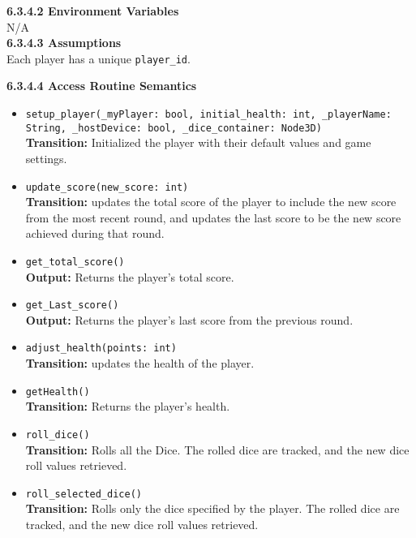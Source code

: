 \documentclass[12pt, titlepage]{article}
\begin{document}
\textbf{6.3.4.2 Environment Variables}\\
N/A\\

\textbf{6.3.4.3 Assumptions}\\
Each player has a unique \texttt{player\_id}.

\textbf{6.3.4.4 Access Routine Semantics}
\begin{itemize}

	\item \texttt{setup\_player(\_myPlayer: bool, initial\_health: int, \_playerName: String, \_hostDevice: bool, \_dice\_container: Node3D)}\\
	 \textbf{Transition:} Initialized the player with their default values and game settings.
	
    \item \texttt{update\_score(new\_score: int)}\\
    	\textbf{Transition:} updates the total score of the player to include the new score from the most recent round, and updates the last score to be the new score achieved during that round.
    
    \item \texttt{get\_total\_score()}\\
    \textbf{Output:} Returns the player's total score.
        	
    \item \texttt{get\_Last\_score()}\\
    \textbf{Output:} Returns the player's last score from the previous round.
    
    \item \texttt{adjust\_health(points: int)}\\
    \textbf{Transition:} updates the health of the player.
    
    \item \texttt{getHealth()}\\
    \textbf{Transition:} Returns the player's health.
    
    \item \texttt{roll\_dice()}\\
    \textbf{Transition:} Rolls all the Dice. The rolled dice are tracked, and the new dice roll values retrieved.
    
    \item \texttt{roll\_selected\_dice()}\\
    \textbf{Transition:} Rolls only the dice specified by the player. The rolled dice are tracked, and the new dice roll values retrieved.
    

\end{itemize}
\end{document}
